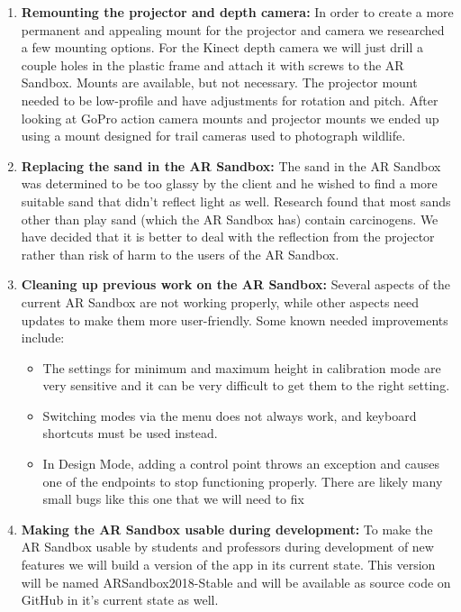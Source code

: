 \documentclass[letterpaper, 10pt, onecolumn, draftclsnofoot]{IEEEtran}
\begin{document}
    \begin{enumerate}[label=]
        \item{\textbf{Remounting the projector and depth camera:}}
            In order to create a more permanent and appealing mount for the projector and camera we researched a few mounting options. For the Kinect depth camera we will just drill a couple holes in the plastic frame and attach it with screws to the AR Sandbox. Mounts are available, but not necessary. The projector mount needed to be low-profile and have adjustments for rotation and pitch. After looking at GoPro action camera mounts and projector mounts we ended up using a mount designed for trail cameras used to photograph wildlife.
        
        \item{\textbf{Replacing the sand in the AR Sandbox:}}
            The sand in the AR Sandbox was determined to be too glassy by the client and he wished to find a more suitable sand that didn't reflect light as well. Research found that most sands other than play sand (which the AR Sandbox has) contain carcinogens. We have decided that it is better to deal with the reflection from the projector rather than risk of harm to the users of the AR Sandbox.
            
        \item{\textbf{Cleaning up previous work on the AR Sandbox:}}
            Several aspects of the current AR Sandbox are not working properly, while other aspects need updates to make them more user-friendly. Some known needed improvements include:
            \begin{itemize}
                \item{} 
                    The settings for minimum and maximum height in calibration mode are very sensitive and it can be very difficult to get them to the right setting.
                \item{} 
                    Switching modes via the menu does not always work, and keyboard shortcuts must be used instead.
                \item{} 
                    In Design Mode, adding a control point throws an exception and causes one of the endpoints to stop functioning properly. There are likely many small bugs like this one that we will need to fix
            \end{itemize}
        
        \item{\textbf{Making the AR Sandbox usable during development:}} 
            To make the AR Sandbox usable by students and professors during development of new features we will build a version of the app in its current state. This version will be named ARSandbox2018-Stable and will be available as source code on GitHub in it's current state as well.
        

\end{enumerate}
\end{document}
